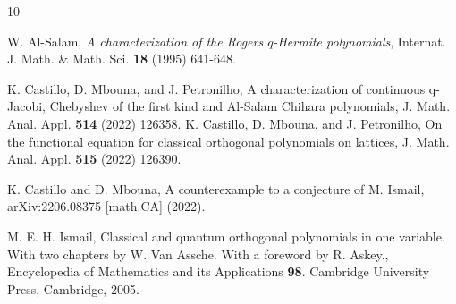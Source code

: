\documentclass{amsart}
\theoremstyle{remark}
\numberwithin{equation}{section}
\begin{document}
\begin{thebibliography}{10}

{W. Al-Salam},
{\it A characterization of the Rogers $q$-Hermite polynomials},
Internat. J. Math. $\&$ Math. Sci. \textbf{18} (1995) 641-648.



{K. Castillo, D. Mbouna, and J. Petronilho}, {A characterization of continuous q-Jacobi, Chebyshev of the first kind and Al-Salam Chihara polynomials}, J. Math. Anal. Appl. {\bf 514} (2022) 126358.
{K. Castillo, D. Mbouna, and J. Petronilho},
{On the functional equation for classical orthogonal polynomials on lattices}, J. Math. Anal. Appl. {\bf 515} (2022) 126390.

 K. Castillo and D. Mbouna, A counterexample to a conjecture of M. Ismail, arXiv:2206.08375 [math.CA] (2022).





{M. E. H. Ismail},
{Classical and quantum orthogonal polynomials in one variable. With two chapters by W. Van Assche.
With a foreword by R. Askey.}, Encyclopedia of Mathematics and its Applications \textbf{98}.
Cambridge University Press, Cambridge, 2005.




\end{thebibliography}
\end{document}
